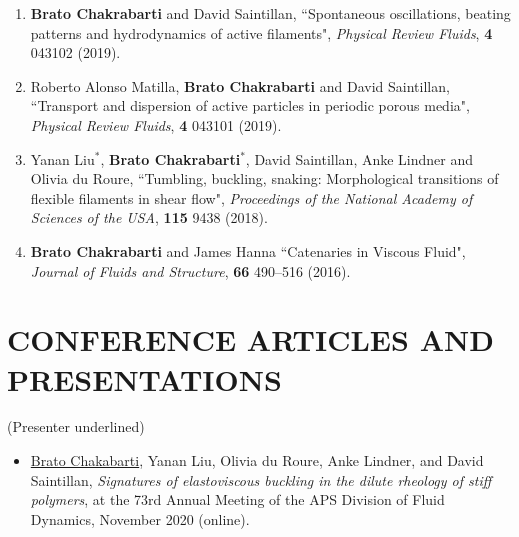 \documentclass[10pt]{res} %
\begin{document}
\begin{resume}
\begin{enumerate}
   
	\item \textbf{Brato Chakrabarti} and David Saintillan, ``Spontaneous oscillations, beating patterns and hydrodynamics of active filaments", \textit{Physical Review Fluids}, \textbf{4} 043102 (2019). 
	
	
	\item Roberto Alonso Matilla, \textbf{Brato Chakrabarti} and David Saintillan, ``Transport and dispersion of active particles in periodic porous media", \textit{Physical Review Fluids}, \textbf{4} 043101 (2019). 
	
	\item Yanan Liu$^*$, \textbf{Brato Chakrabarti}$^*$, David Saintillan, Anke Lindner and Olivia du Roure, ``Tumbling, buckling, snaking: Morphological transitions
	of flexible filaments in shear flow", \textit{Proceedings of the National Academy of Sciences of the USA}, \textbf{115} 9438 (2018).
	
	
	\item \textbf{Brato Chakrabarti} and James Hanna ``Catenaries in Viscous Fluid", \textit{Journal of Fluids and Structure}, \textbf{66} 490–516 (2016).

\end{enumerate}

\vspace*{-0.2cm}

	
	


\section{{CONFERENCE ARTICLES AND PRESENTATIONS}} 
\vspace*{1mm}
{(Presenter underlined)}
\vspace*{1mm}
\begin{itemize}
		\item \underline{Brato Chakabarti}, Yanan Liu, Olivia du Roure, Anke Lindner, and David Saintillan, \textit{Signatures of elastoviscous buckling in the dilute rheology of stiff polymers}, at the 73rd Annual Meeting of the APS Division of Fluid Dynamics, November 2020 (online).
		

\end{itemize}
\end{resume}
\end{document}
